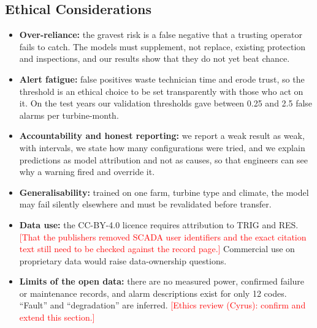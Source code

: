 \documentclass[12pt,a4paper]{article}
\newcommand{\tbc}[1]{\textcolor{red}{[#1]}}
\begin{document}
	\subsection{Ethical Considerations}
	\begin{itemize}
		\item \textbf{Over-reliance:} the gravest risk is a false negative that a trusting operator fails to catch. The models must supplement, not replace, existing protection and inspections, and our results show that they do not yet beat chance.
		\item \textbf{Alert fatigue:} false positives waste technician time and erode trust, so the threshold is an ethical choice to be set transparently with those who act on it. On the test years our validation thresholds gave between 0.25 and 2.5 false alarms per turbine-month.
		\item \textbf{Accountability and honest reporting:} we report a weak result as weak, with intervals, we state how many configurations were tried, and we explain predictions as model attribution and not as causes, so that engineers can see why a warning fired and override it.
		\item \textbf{Generalisability:} trained on one farm, turbine type and climate, the model may fail silently elsewhere and must be revalidated before transfer.
		\item \textbf{Data use:} the CC-BY-4.0 licence requires attribution to TRIG and RES. \tbc{That the publishers removed SCADA user identifiers \cite{hot_dataset_v1} and the exact citation text still need to be checked against the record page.} Commercial use on proprietary data would raise data-ownership questions.
		\item \textbf{Limits of the open data:} there are no measured power, confirmed failure or maintenance records, and alarm descriptions exist for only 12 codes. ``Fault'' and ``degradation'' are inferred. \tbc{Ethics review (Cyrus): confirm and extend this section.}
	\end{itemize}
\end{document}
